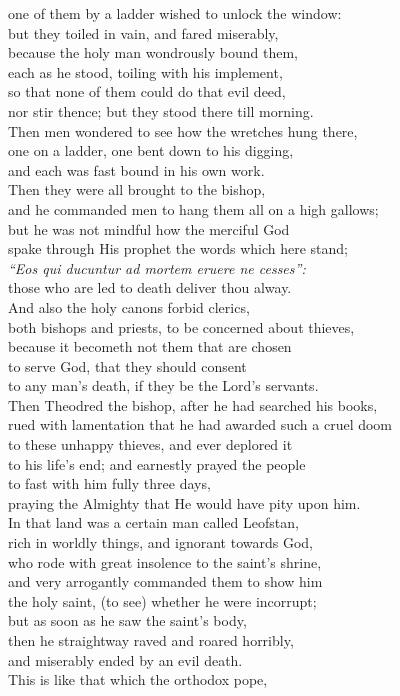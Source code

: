 \documentclass[10pt]{book}
\begin{document}
\begin{center}
\parbox{\pagelen}{
one of them by a ladder wished to unlock the window: \\
but they toiled in vain, and fared miserably, \\
because the holy man wondrously bound them, \\
each as he stood, toiling with his implement, \\
so that none of them could do that evil deed, \\
nor stir thence; but they stood there till morning. \\
Then men wondered to see how the wretches hung there, \\
one on a ladder, one bent down to his digging, \\
and each was fast bound in his own work. \\
Then they were all brought to the bishop, \\
and he commanded men to hang them all on a high gallows; \\
but he was not mindful how the merciful God \\
spake through His prophet the words which here stand; \\
\emph{``Eos qui ducuntur ad mortem eruere ne cesses'':} \\
those who are led to death deliver thou alway. \\
And also the holy canons forbid clerics, \\
both bishops and priests, to be concerned about thieves, \\
because it becometh not them that are chosen \\
to serve God, that they should consent \\
to any man's death, if they be the Lord's servants. \\
Then Theodred the bishop, after he had searched his books, \\
rued with lamentation that he had awarded such a cruel doom \\
to these unhappy thieves, and ever deplored it \\
to his life's end; and earnestly prayed the people \\
to fast with him fully three days, \\
praying the Almighty that He would have pity upon him. \\
In that land was a certain man called Leofstan, \\
rich in worldly things, and ignorant towards God, \\
who rode with great insolence to the saint's shrine, \\
and very arrogantly commanded them to show him \\
the holy saint, (to see) whether he were incorrupt; \\
but as soon as he saw the saint's body, \\
then he straightway raved and roared horribly, \\
and miserably ended by an evil death. \\
This is like that which the orthodox pope, \\
} 
\end{center}
\end{document}
